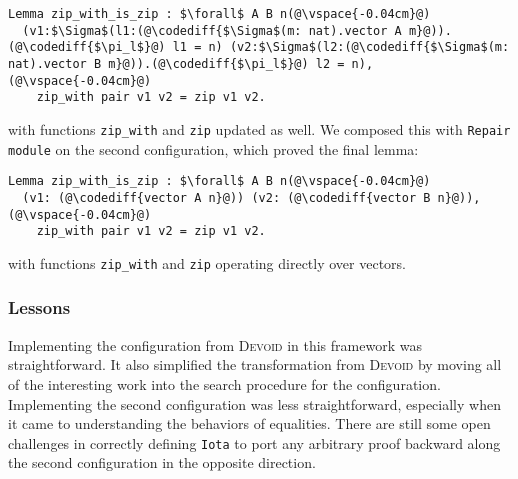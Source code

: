 \begin{lstlisting}[backgroundcolor=\color{cyan!30}]
Lemma zip_with_is_zip : $\forall$ A B n(@\vspace{-0.04cm}@)
  (v1:$\Sigma$(l1:(@\codediff{$\Sigma$(m: nat).vector A m}@)).(@\codediff{$\pi_l$}@) l1 = n) (v2:$\Sigma$(l2:(@\codediff{$\Sigma$(m: nat).vector B m}@)).(@\codediff{$\pi_l$}@) l2 = n),(@\vspace{-0.04cm}@)
    zip_with pair v1 v2 = zip v1 v2.
\end{lstlisting}
with functions \lstinline{zip_with} and \lstinline{zip} updated as well.
We composed this with \lstinline{Repair module} on the second configuration,
which proved the final lemma:

\begin{lstlisting}[backgroundcolor=\color{cyan!30}]
Lemma zip_with_is_zip : $\forall$ A B n(@\vspace{-0.04cm}@)
  (v1: (@\codediff{vector A n}@)) (v2: (@\codediff{vector B n}@)),(@\vspace{-0.04cm}@)
    zip_with pair v1 v2 = zip v1 v2.
\end{lstlisting}
with functions \lstinline{zip_with} and \lstinline{zip} operating directly over vectors.

\subsubsection{Lessons}

Implementing the configuration from \textsc{Devoid} in this framework was straightforward.
It also simplified the transformation from \textsc{Devoid} %
by moving all of the interesting work into the search procedure for the configuration.
Implementing the second configuration was less straightforward,
especially when it came to understanding the behaviors of equalities.
There are still some open challenges in correctly defining \lstinline{Iota} to port any arbitrary
proof backward along the second configuration in the opposite direction.

